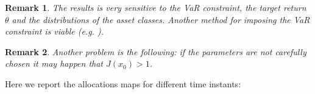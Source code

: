 \documentclass[]{article}
\newtheorem{remark}{Remark}
\begin{document}
\begin{remark}
	The results is very sensitive to the VaR constraint, the target return $\theta$ and the distributions of the asset classes. Another method for imposing the VaR constraint is viable (e.g. \cite{Lue13}). 
\end{remark}
\begin{remark}
	Another problem is the following: if the parameters are not carefully chosen it may happen that $J(x_0) > 1 $.
\end{remark}
Here we report the allocations maps for different time instants:
\begin{figure}[H]
	\\

\end{figure}
\end{document}
